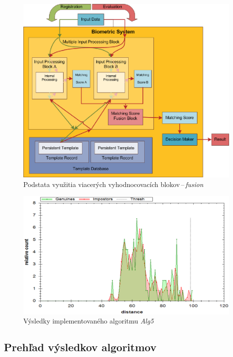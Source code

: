\documentclass[11pt,a4paper]{article}
\begin{document}
\vfill
\begin{figure}[ht!]
	\centering
	\includegraphics[width=12cm]{fig/fusion.eps}
	\caption{\label{fig:fusion} Podstata využitia viacerých vyhodnocovacích
	blokov\,--\,\emph{fusion}}
\end{figure}
\vfill
\vfill

\clearpage

\vfill
\begin{figure}[ht!]
	\centering
	\includegraphics[width=17cm]{fig/alg5.eps}
	\caption{\label{fig:alg5} Výsledky implementovaného algoritmu \emph{Alg5}}
\end{figure}
\vfill
\vfill

\clearpage
\subsection{Prehľad výsledkov algoritmov} \label{vysledky}
\end{document}
